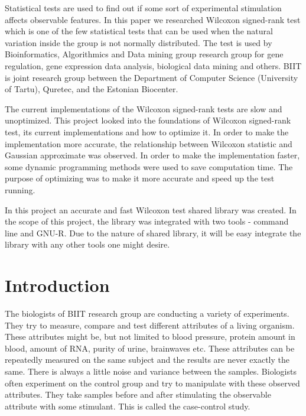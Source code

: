 \documentclass[12pt]{article}
\begin{document}
{
Statistical tests are used to find out if some sort of experimental stimulation affects observable features. In this paper we researched Wilcoxon signed-rank test which is one of the few statistical tests that can be used when the natural variation inside the group is not normally distributed. The test is used by Bioinformatics, Algorithmics and Data mining group research group for gene regulation, gene expression data analysis, biological data mining and others. BIIT is joint research group between the Department of Computer Science (University of Tartu), Quretec, and the Estonian Biocenter.

The current implementations of the Wilcoxon signed-rank tests are slow and unoptimized. This project looked into the foundations of Wilcoxon signed-rank test, its current implementations and how to optimize it. In order to make the implementation more accurate, the relationship between Wilcoxon statistic and Gaussian approximate was observed. In order to make the implementation faster, some dynamic programming methods were used to save computation time. The purpose of optimizing was to make it more accurate and speed up the test running.

In this project an accurate and fast Wilcoxon test shared library was created. In the scope of this project, the library was integrated with two tools - command line and GNU-R. Due to the nature of shared library, it will be easy integrate the library with any other tools one might desire.

\vspace*{3ex}
{}



\newpage

\tableofcontents

\newpage

\section{Introduction}
The biologists of BIIT research group are conducting a variety of experiments. They try to measure, compare and test different attributes of a living organism. These attributes might be, but not limited to blood pressure, protein amount in blood, amount of RNA, purity of urine, brainwaves etc. These attributes can be repeatedly measured on the same subject and the results are never exactly the same. There is always a little noise and variance between the samples. Biologists often experiment on the control group and try to manipulate with these observed attributes. They take samples before and after stimulating the observable attribute with some stimulant. This is called the case-control study.

}
\end{document}
